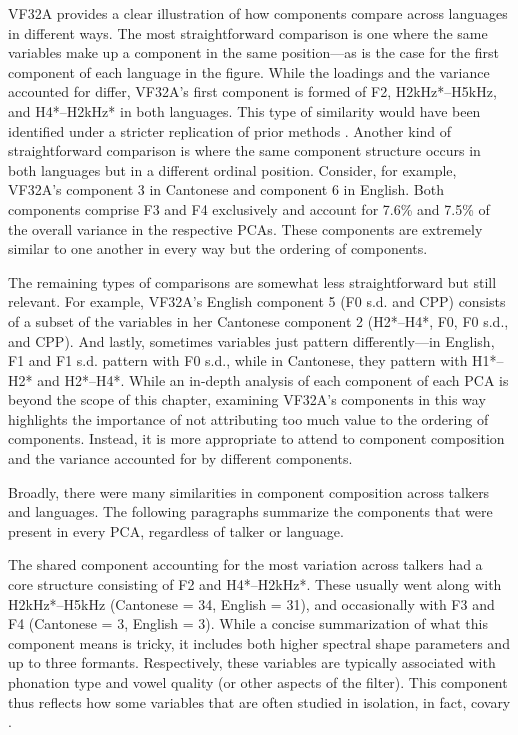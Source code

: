 VF32A provides a clear illustration of how components compare across languages in different ways. The most straightforward comparison is one where the same variables make up a component in the same position---as is the case for the first component of each language in the figure. While the loadings and the variance accounted for differ, VF32A's first component is formed of F2, H2kHz*--H5kHz, and H4*--H2kHz* in both languages. This type of similarity would have been identified under a stricter replication of prior methods \citep{lee_2019_acoustic}. Another kind of straightforward comparison is where the same component structure occurs in both languages but in a different ordinal position. Consider, for example, VF32A's component 3 in Cantonese and component 6 in English. Both components comprise F3 and F4 exclusively and account for 7.6\% and 7.5\% of the overall variance in the respective PCAs. These components are extremely similar to one another in every way but the ordering of components. 

The remaining types of comparisons are somewhat less straightforward but still relevant. For example, VF32A's English component 5 (F0 s.d. and CPP) consists of a subset of the variables in her Cantonese component 2 (H2*--H4*, F0, F0 s.d., and CPP). And lastly, sometimes variables just pattern differently---in English, F1 and F1 s.d. pattern with F0 s.d., while in Cantonese, they pattern with H1*--H2* and H2*--H4*. While an in-depth analysis of each component of each PCA is beyond the scope of this chapter, examining VF32A's components in this way highlights the importance of not attributing too much value to the ordering of components. Instead, it is more appropriate to attend to component composition and the variance accounted for by different components. 

Broadly, there were many similarities in component composition across talkers and languages. The following paragraphs summarize the components that were present in every PCA, regardless of talker or language. 

The shared component accounting for the most variation across talkers had a core structure consisting of F2 and H4*--H2kHz*. These usually went along with H2kHz*--H5kHz (Cantonese = 34, English = 31), and occasionally with F3 and F4 (Cantonese = 3, English = 3). While a concise summarization of what this component means is tricky, it includes both higher spectral shape parameters and up to three formants. Respectively, these variables are typically associated with phonation type and vowel quality (or other aspects of the filter). This component thus reflects how some variables that are often studied in isolation, in fact, covary \citep[for a cautionary tale of interpreting F3 and voice quality in the context of sound change, see][]{soskuthy_2020_codar}. 


